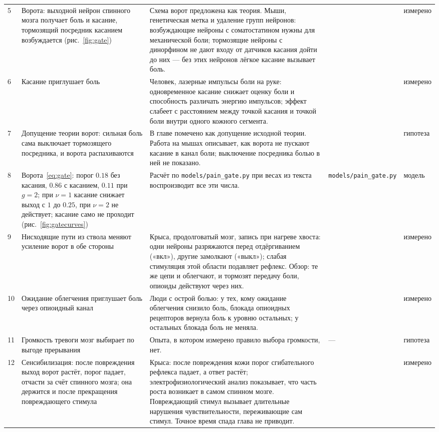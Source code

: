 {\begin{longtable}{>{\raggedright}p{0.5cm}>{\raggedright}p{4.0cm}>{\raggedright}p{5.6cm}>{\raggedright}p{2.3cm}>{\raggedright\arraybackslash}p{1.7cm}}
5 & Ворота: выходной нейрон спинного мозга получает боль и касание, тормозящий посредник касанием возбуждается (рис.~\ref{fig:gate}) & Схема ворот предложена как теория. Мыши, генетическая метка и удаление групп нейронов: возбуждающие нейроны с соматостатином нужны для механической боли; тормозящие нейроны с динорфином не дают входу от датчиков касания дойти до них --- без этих нейронов лёгкое касание вызывает боль. & \cite{MelzackWall1965, Duan2014} & измерено \\
6 & Касание приглушает боль & Человек, лазерные импульсы боли на руке: одновременное касание снижает оценку боли и способность различать энергию импульсов; эффект слабеет с расстоянием между точкой касания и точкой боли внутри одного кожного сегмента. & \cite{Mancini2014touch} & измерено \\
7 & Допущение теории ворот: сильная боль сама выключает тормозящего посредника, и ворота распахиваются & В главе помечено как допущение исходной теории. Работа на мышах описывает, как ворота не пускают касание в канал боли; выключение посредника болью в ней не показано. & \cite{MelzackWall1965} & гипотеза \\
8 & Ворота~\eqref{eq:gate}: порог $0.18$ без касания, $0.86$ с касанием, $0.11$ при $g=2$; при $\nu=1$ касание снижает выход с $1$ до $0.25$, при $\nu=2$ не действует; касание само не проходит (рис.~\ref{fig:gatecurves}) & Расчёт по \texttt{models/\allowbreak pain\_\allowbreak gate.py} при весах из текста воспроизводит все эти числа. & \texttt{models/\allowbreak pain\_\allowbreak gate.py} & модель \\
9 & Нисходящие пути из ствола меняют усиление ворот в обе стороны & Крыса, продолговатый мозг, запись при нагреве хвоста: одни нейроны разряжаются перед отдёргиванием («вкл»), другие замолкают («выкл»); слабая стимуляция этой области подавляет рефлекс. Обзор: те же цепи и облегчают, и тормозят передачу боли, опиоиды действуют через них. & \cite{Fields1983rvm, Fields2004} & измерено \\
10 & Ожидание облегчения приглушает боль через опиоидный канал & Люди с острой болью: у тех, кому ожидание облегчения снизило боль, блокада опиоидных рецепторов вернула боль к уровню остальных; у остальных блокада боль не меняла. & \cite{Levine1978} & измерено \\
11 & Громкость тревоги мозг выбирает по выгоде прерывания & Опыта, в котором измерено правило выбора громкости, нет. & --- & гипотеза \\
12 & Сенсибилизация: после повреждения выход ворот растёт, порог падает, отчасти за счёт спинного мозга; она держится и после прекращения повреждающего стимула & Крыса: после повреждения кожи порог сгибательного рефлекса падает, а ответ растёт; электрофизиологический анализ показывает, что часть роста возникает в самом спинном мозге. Повреждающий стимул вызывает длительные нарушения чувствительности, переживающие сам стимул. Точное время спада глава не приводит. & \cite{Woolf1983} & измерено \\

\end{longtable}}
